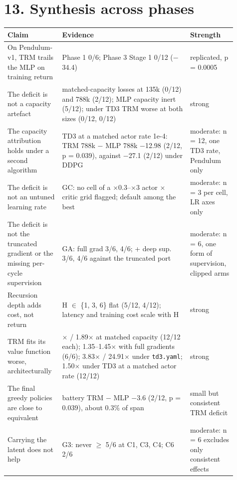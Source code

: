 \documentclass[11pt]{article}
\begin{document}
\section*{13. Synthesis across phases}



\begin{center}\small\begin{tabular}{>{\raggedright\arraybackslash}p{0.204\linewidth}>{\raggedright\arraybackslash}p{0.521\linewidth}>{\raggedright\arraybackslash}p{0.181\linewidth}}
\toprule
Claim & Evidence & Strength \\
\midrule
On Pendulum-v1, TRM trails the MLP on training return & Phase 1 0/6; Phase 3 Stage 1 0/12 ($-$34.4) & replicated, p = 0.0005 \\
The deficit is not a capacity artefact & matched-capacity losses at 135k (0/12) and 788k (2/12); MLP capacity inert (5/12); under TD3 TRM worse at both sizes (0/12, 0/12) & strong \\
The capacity attribution holds under a second algorithm & TD3 at a matched actor rate 1e-4: TRM 788k $-$ MLP 788k $-$12.98 (2/12, p = 0.039), against $-$27.1 (2/12) under DDPG & moderate: n = 12, one TD3 rate, Pendulum only \\
The deficit is not an untuned learning rate & GC: no cell of a $\times$0.3--$\times$3 actor $\times$ critic grid flagged; default among the best & moderate: n = 3 per cell, LR axes only \\
The deficit is not the truncated gradient or the missing per-cycle supervision & GA: full grad 3/6, 4/6; + deep sup. 3/6, 4/6 against the truncated port & moderate: n = 6, one form of supervision, clipped arms \\
Recursion depth adds cost, not return & H $\in$ \{1, 3, 6\} flat (5/12, 4/12); latency and training cost scale with H & strong \\
TRM fits its value function worse, architecturally & 1.45$\times$ / 1.89$\times$ at matched capacity (12/12 each); 1.35--1.45$\times$ with full gradients (6/6); 3.83$\times$ / 24.91$\times$ under \texttt{td3.yaml}; 1.50$\times$ under TD3 at a matched actor rate (12/12) & strong \\
The final greedy policies are close to equivalent & battery TRM $-$ MLP $-$3.6 (2/12, p = 0.039), about 0.3\% of span & small but consistent TRM deficit \\
Carrying the latent does not help & G3: never $\geq$ 5/6 at C1, C3, C4; C6 2/6 & moderate: n = 6 excludes only consistent effects \\

\end{tabular}
\end{center}
\end{document}
